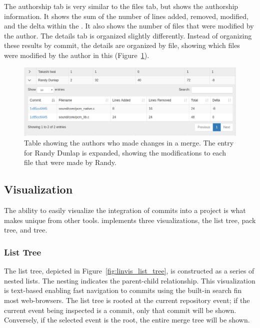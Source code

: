 The authorship tab is very similar to the files tab, but shows the
authorship information. It shows the sum of the number of lines added,
removed, modified, and the delta within the \mt. It also shows
the number of files that were modified by the author. The details tab is
organized slightly differently. Instead of organizing these results by
commit, the details are organized by file, showing which files were
modified by the author in this \mt (Figure~\ref{fig:linvis_authors}).

\begin{figure}[htpb]
  \centering
  \includegraphics[width=\linewidth]{figures/linvis/linvis_authors.png}
  \caption{Table showing the authors who made changes in a merge. The
    entry for Randy Dunlap is expanded, showing the modifications to
    each file that were made by Randy.}
  \label{fig:linvis_authors}
\end{figure}


\subsection{Visualization}
\label{sub:visualization}

The ability to easily visualize the integration of commits into a
project is what makes \tool unique from other tools. \tool implements
three visualizations, the list tree, pack tree, and \rt tree.

\subsubsection{List Tree}

The list tree, depicted in Figure~\ref{fig:linvis_list_tree}, is
constructed as a series of nested lists. The nesting indicates the
parent-child relationship. This visualization is text-based enabling
fast navigation to commits using the built-in search fin most
web-browsers. The list tree is rooted at the current repository event;
if the current event being inspected is a commit, only that commit will
be shown. Conversely, if the selected event is the root, the entire
merge tree will be shown.


